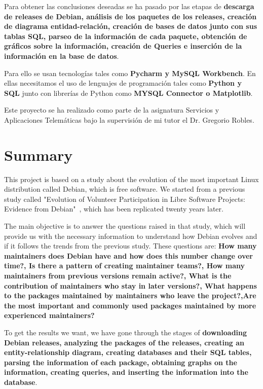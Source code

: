 \documentclass[a4paper, 12pt]{book}
\begin{document}
Para obtener las conclusiones deseadas se ha pasado por las etapas de \textbf {descarga de releases de Debian, análisis de los paquetes de los releases, creación de diagrama entidad-relación, creación de bases de datos junto con sus tablas SQL, parseo de la información de cada paquete, obtención de gráficos sobre la información, creación de Queries e inserción de la información en la base de datos}.

Para ello se usan tecnologías tales como \textbf {Pycharm y MySQL Workbench}.
En ellas necesitamos el uso de lenguajes de programación tales como \textbf {Python y SQL} junto con librerías de Python como \textbf {MYSQL Connector o Matplotlib}.

Este proyecto se ha realizado como parte de la asignatura Servicios y Aplicaciones Telemáticas bajo la supervisión de mi tutor el Dr. Gregorio Robles.



\chapter*{Summary}
This project is based on a study about the evolution of the most important Linux distribution called Debian, which is free software. We started from a previous study called "Evolution of Volunteer Participation in Libre Software Projects: Evidence from Debian"~\cite{robles05:_debian}, which has been replicated twenty years later.

The main objective is to answer the questions raised in that study, which will provide us with the necessary information to understand how Debian evolves and if it follows the trends from the previous study.
These questions are: \textbf{How many maintainers does Debian have and how does this number change over time?, Is there a pattern of creating maintainer teams?, How many maintainers from previous versions remain active?, What is the contribution of maintainers who stay in later versions?, What happens to the packages maintained by maintainers who leave the project?,Are the most important and commonly used packages maintained by more experienced maintainers?}

To get the results we want, we have gone through the stages of \textbf{downloading Debian releases, analyzing the packages of the releases, creating an entity-relationship diagram, creating databases and their SQL tables, parsing the information of each package, obtaining graphs on the information, creating queries, and inserting the information into the database}.
\end{document}

